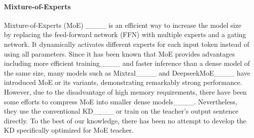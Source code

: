 \paragraph{Mixture-of-Experts}
Mixture-of-Experts (MoE) ____ is an efficient way to increase the model size by replacing the feed-forward network (FFN) with multiple experts and a gating network.
It dynamically activates different experts for each input token instead of using all parameters.
Since it has been known that MoE provides advantages including more efficient training____ and faster inference than a dense model of the same size, many models such as Mixtral____ and DeepseekMoE____ have introduced MoE or its variants, demonstrating remarkably strong performance.
However, due to the disadvantage of high memory requirements, there have been some efforts to compress MoE into smaller dense models____.
Nevertheless, they use the conventional KD____ or train on the teacher's output sentence directly. To the best of our knowledge, there has been no attempt to develop the KD specifically optimized for MoE teacher.